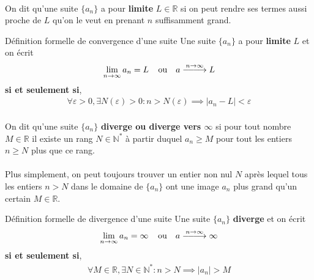 \documentclass[16pt]{report}
\DeclareRobustCommand{\looongrightarrow}{%
  \DOTSB\relbar\joinrel\relbar\joinrel\relbar\joinrel\rightarrow
}
\begin{document}
\begin{multicols*}{2}
    \paragraph{}
    On dit qu'une suite $\{a_n\}$ a pour 
    \textbf{limite} $L \in \mathbb{R}$ si on peut rendre ses termes 
    aussi proche de $L$ qu'on le veut en prenant $n$ suffisamment grand. 



    \begin{Definitionx}{Définition formelle de convergence d'une suite}{}
      Une suite $\{ a_n \}$ a pour \textbf{limite} $L$ et on écrit 
      \begin{align*}
        \lim\limits_{n  \to  \infty}{a_n} = 
        L \; \; \; \;\text{ou} \quad 
        a \stackrel{n \to \infty}{\looongrightarrow} L 
      \end{align*}
      \textbf{si et seulement si}, 
      \begin{align}
        \forall\varepsilon > 0, \exists N\left( \varepsilon \right) > 0 : 
        n > N\left( \varepsilon \right) \implies 
        |a_n -L| < \varepsilon
      \end{align}
    \end{Definitionx}


    \paragraph{}
    On dit qu'une suite $\{a_n\}$ 
    \textbf{diverge ou diverge vers $\infty$} 
    si pour tout nombre $M \in \mathbb{R}$ il existe un rang
    $N \in \mathbb{N}^{*}$ à partir duquel $a_n \geq M$ pour tout 
    les entiers $n \geq N$ plus que ce rang. 


    \paragraph{}
    Plus simplement, on peut toujours trouver un entier non nul 
    $N$ après lequel tous les entiers $n > N$ dans le domaine
    de $\{ a_n \}$ ont une image $a_n$ plus grand qu'un certain 
    $M \in \mathbb{R}$. 


    \begin{Definitionx}{Définition formelle de divergence d'une suite}{}
        Une suite $\{ a_n \}$ \textbf{diverge} et on écrit 
      \begin{align*}
        \lim\limits_{n  \to  \infty}{a_n} = 
        \infty \; \; \; \;\text{ou} \quad 
        a \stackrel{n \to \infty}{\looongrightarrow} \infty 
      \end{align*}
      \textbf{si et seulement si},  
        \begin{align*}
            \forall M \in \mathbb{R}, \exists N \in \mathbb{N}^{*} :
            n > N \implies |a_n| > M 
        \end{align*}
    \end{Definitionx}   


\end{multicols*}
\end{document}
